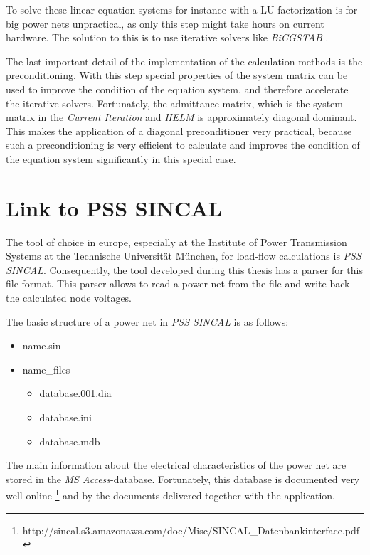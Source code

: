 To solve these linear equation systems for instance with a LU-factorization is for big power nets unpractical, as only this step might take hours on current hardware. The solution to this is to use iterative solvers like \emph{BiCGSTAB} \cite{bicgstab}.

The last important detail of the implementation of the calculation methods is the preconditioning. With this step special properties of the system matrix can be used to improve the condition of the equation system, and therefore accelerate the iterative solvers. Fortunately, the admittance matrix, which is the system matrix in the \emph{Current Iteration} and \emph{HELM} is approximately diagonal dominant. This makes the application of a diagonal preconditioner very practical, because such a preconditioning is very efficient to calculate and improves the condition of the equation system significantly in this special case.

\section{Link to PSS SINCAL}
\label{sec:link_sincal}
The tool of choice in europe, especially at the Institute of Power Transmission Systems at the Technische Universität München, for load-flow calculations is \emph{PSS SINCAL}. Consequently, the tool developed during this thesis has a parser for this file format. This parser allows to read a power net from the file and write back the calculated node voltages.

The basic structure of a power net in \emph{PSS SINCAL} is as follows:
\begin{itemize}
	\item {\textlangle}name{\textrangle}.sin
	\item {\textlangle}name{\textrangle\_}files
	\begin{itemize}
		\item database.001.dia
		\item database.ini
		\item database.mdb
	\end{itemize}
\end{itemize}

The main information about the electrical characteristics of the power net are stored in the \emph{MS Access}-database. Fortunately, this database is documented very well online \footnote{http://sincal.s3.amazonaws.com/doc/Misc/SINCAL\_Datenbankinterface.pdf} and by the documents delivered together with the application.

